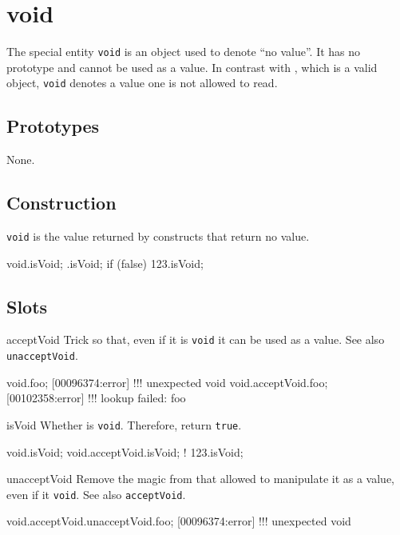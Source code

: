 
\section{void}

The special entity \lstinline|void| is an object used to denote ``no
value''.  It has no prototype and cannot be used as a value.  In
contrast with , which is a valid object,
\lstinline|void| denotes a value one is not allowed to read.

\subsection{Prototypes}

None.

\subsection{Construction}

\lstinline|void| is the value returned by constructs that return no
value.

\begin{urbiassert}[firstnumber=1]
void.isVoid;
{}.isVoid;
{if (false) 123}.isVoid;
\end{urbiassert}

\subsection{Slots}

\begin{urbiscriptapi}
\item[acceptVoid]
  Trick \this so that, even if it is \lstinline|void| it
  can be used as a value.  See also \lstinline|unacceptVoid|.
\begin{urbiscript}
void.foo;
[00096374:error] !!! unexpected void
void.acceptVoid.foo;
[00102358:error] !!! lookup failed: foo
\end{urbiscript}

\item[isVoid]
  Whether \this is \lstinline|void|.  Therefore, return
  \lstinline|true|.
\begin{urbiassert}
void.isVoid;
void.acceptVoid.isVoid;
! 123.isVoid;
\end{urbiassert}

\item[unacceptVoid]
  Remove the magic from \this that allowed to manipulate it
  as a value, even if it \lstinline|void|.  See also
  \lstinline|acceptVoid|.
\begin{urbiscript}
void.acceptVoid.unacceptVoid.foo;
[00096374:error] !!! unexpected void
\end{urbiscript}

\end{urbiscriptapi}




